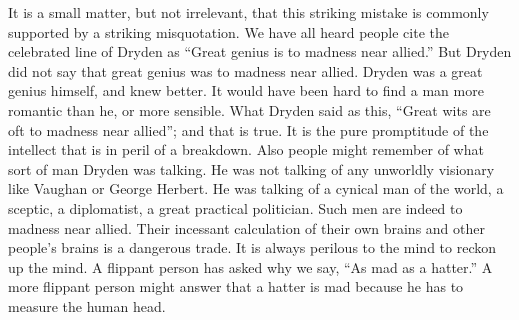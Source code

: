 \documentclass{book}
\begin{document}
It is a small matter, but not irrelevant, that this striking mistake is commonly supported by a striking misquotation. We have all heard people cite the celebrated line of Dryden as “Great genius is to madness near allied.” But Dryden did not say that great genius was to madness near allied. Dryden was a great genius himself, and knew better. It would have been hard to find a man more romantic than he, or more sensible. What Dryden said as this, “Great wits are oft to madness near allied”; and that is true. It is the pure promptitude of the intellect that is in peril of a breakdown. Also people might remember of what sort of man Dryden was talking. He was not talking of any unworldly visionary like Vaughan or George Herbert. He was talking of a cynical man of the world, a sceptic, a diplomatist, a great practical politician. Such men are indeed to madness near allied. Their incessant calculation of their own brains and other people’s brains is a dangerous trade. It is always perilous to the mind to reckon up the mind. A flippant person has asked why we say, “As mad as a hatter.” A more flippant person might answer that a hatter is mad because he has to measure the human head.
\end{document}
